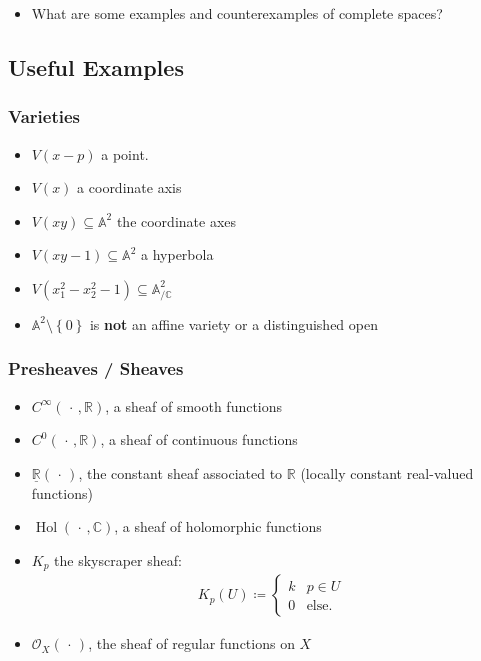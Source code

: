 \begin{itemize}
  \begin{itemize}
  \tightlist
  \item
    What are some examples and counterexamples of complete spaces?
  \end{itemize}
\end{itemize}

\newpage

\hypertarget{useful-examples}{%
\subsection{Useful Examples}\label{useful-examples}}

\hypertarget{varieties}{%
\subsubsection{Varieties}\label{varieties}}

\begin{itemize}
\tightlist
\item
  \(V(x-p)\) a point.
\item
  \(V(x)\) a coordinate axis
\item
  \(V(xy) \subseteq {\mathbb{A}}^2\) the coordinate axes
\item
  \(V(xy-1) \subseteq {\mathbb{A}}^2\) a hyperbola
\item
  \(V(x_1^2 - x_2^2 - 1) \subseteq {\mathbb{A}}^2_{/{\mathbb{C}}}\)
\item
  \({\mathbb{A}}^2\setminus\left\{{0}\right\}\) is \textbf{not} an
  affine variety or a distinguished open
\end{itemize}

\hypertarget{presheaves-sheaves}{%
\subsubsection{Presheaves / Sheaves}\label{presheaves-sheaves}}

\begin{itemize}
\tightlist
\item
  \(C^\infty({\,\cdot\,}, {\mathbb{R}})\), a sheaf of smooth functions
\item
  \(C^0({\,\cdot\,}, {\mathbb{R}})\), a sheaf of continuous functions
\item
  \(\underline{{\mathbb{R}}}({\,\cdot\,})\), the constant sheaf
  associated to \({\mathbb{R}}\) (locally constant real-valued
  functions)
\item
  \(\operatorname{Hol}({\,\cdot\,}, {\mathbb{C}})\), a sheaf of
  holomorphic functions
\item
  \(K_p\) the skyscraper sheaf:
  \begin{align*}  
  K_p(U) \coloneqq
  \begin{cases}
  k & p\in U \\
  0 & \text{else}.
  \end{cases}
  \end{align*}
\item
  \({\mathcal{O}}_X({\,\cdot\,})\), the sheaf of regular functions on
  \(X\)
\end{itemize}

